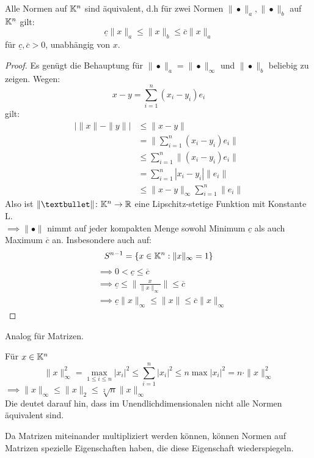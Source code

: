 \begin{theorem}
	Alle Normen auf $\mathbb{K}^{n}$ sind äquivalent, d.h für zwei Normen $\|•\|_a, \|•\|_b$ auf $\mathbb{K}^{n}$ gilt:
	\[
	\underline{c} \|x\|_a \le \|x\|_b\le \overline{c}\|x\|_a
	\]
für $\underline{c},\overline{c}>0$, unabhängig von $x$. 
\end{theorem}
\begin{proof}
Es genügt die Behauptung für $\|•\|_a = \|•\|_{\infty}$  und $\|•\|_b$  beliebig zu zeigen. Wegen:
\[
x-y = \sum_{i=1}^{n}(x_{i}-y_{i}) e_i
\]
gilt:
\begin{align*}
	\lvert \|x\|-\|y\|\rvert &\le  \|x-y\| \\
				 &= \|\sum_{i=1}^{n}(x_{i}-y_{i}) e_i\| \\
				 &\le \sum_{i=1}^{n}\|(x_{i}-y_{i})e_i\| \\
				 &= \sum_{i=1}^{n}|x_{i}-y_{i}| \|e_i\| \\
				 &\le \|x-y\|_{\infty} \sum_{i=1}^{n}\|e_i\|
\end{align*}
Also ist $\|•\| \colon \K^{n} \to \R $ eine Lipschitz-stetige Funktion mit Konstante L. \\
$\implies \|•\|$ nimmt auf jeder kompakten Menge sowohl Minimum $\underline{c}$ als auch Maximum $\overline{c}$ an. Insbesondere auch auf:
\[
S^{n-1} = \{x \in \mathbb{K}^{n} : \|x\|_{\infty} =1\} 
\]
\begin{align*}
&\implies 0 < \underline{c} \le \overline{c} \\
&\implies \underline{c} \le \|\frac{x}{\|x\|_{\infty}}\|\le \overline{c} \\
&\implies \underline{c} \|x\|_{\infty} \le \|x\| \le \overline{c}\|x\|_{\infty}
\end{align*}
\end{proof}
\begin{corollary}
	Analog für Matrizen.
\end{corollary}
\begin{example}
Für $x \in \mathbb{K}^{n}$
\[
\|x\|_{\infty}^2 = \max_{1\le i\le n} |x_i|^2 \le \sum_{i=1}^{n}|x_{i}|^2 \le n \max |x_{i}|^2 = n \cdot  \|x\|_{\infty}^2
\]
$\implies \|x\|_{\infty} \le \|x\|_2 \le \sqrt[2]{n} \|x\|_{\infty}$ \\
Die deutet darauf hin, dass im Unendlichdimensionalen nicht alle Normen äquivalent sind.
\end{example}
Da Matrizen miteinander multipliziert werden können, können Normen auf Matrizen spezielle Eigenschaften haben, die diese Eigenschaft wiederspiegeln.

